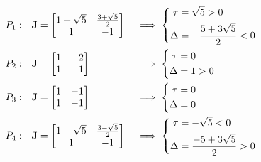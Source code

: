 \begin{alignat*}{3}
    P_1:&\quad \textbf{J} = \begin{bmatrix}
        1+\sqrt{5} & \frac{3+\sqrt{5}}{2}\\
        1 & -1
    \end{bmatrix} &&\implies \begin{dcases}
    \begin{aligned}
        \tau &= \sqrt{5}>0\\
        \Delta &= -\frac{5+3\sqrt{5}}{2}<0
    \end{aligned}
    \end{dcases}\\
    P_2:&\quad \textbf{J} = \begin{bmatrix}
        1 & -2\\
        1 & -1
    \end{bmatrix} &&\implies \begin{dcases}
    \begin{aligned}
        \tau &= 0\\
        \Delta &= 1>0
    \end{aligned}
    \end{dcases}\\
    P_3:&\quad \textbf{J} = \begin{bmatrix}
        1 & -1\\
        1 & -1
    \end{bmatrix} &&\implies \begin{dcases}
    \begin{aligned}
        \tau &= 0\\
        \Delta &= 0
    \end{aligned}
    \end{dcases}\\
    P_4:&\quad \textbf{J} = \begin{bmatrix}
        1-\sqrt{5} & \frac{3-\sqrt{5}}{2}\\
        1 & -1
    \end{bmatrix} &&\implies \begin{dcases}
    \begin{aligned}
        \tau &= -\sqrt{5}<0\\
        \Delta &= \frac{-5+3\sqrt{5}}{2}>0
    \end{aligned}
    \end{dcases}
\end{alignat*}
